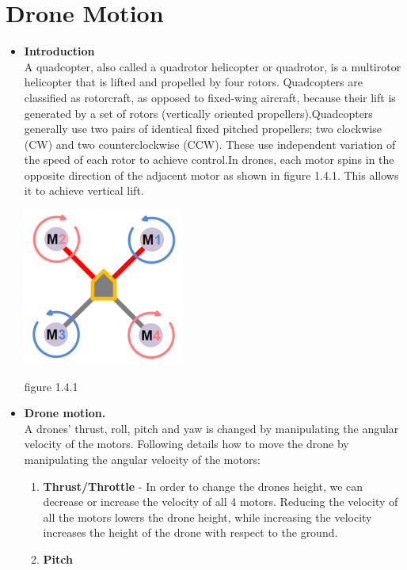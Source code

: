 \documentclass[a4paper,12pt,oneside]{book}
\begin{document}
\section{Drone Motion}
    \begin{itemize}
        \item \textbf{Introduction}\\
        A quadcopter, also called a quadrotor helicopter or quadrotor, is a multirotor helicopter that is lifted and propelled by four rotors. Quadcopters are classified as rotorcraft, as opposed to fixed-wing aircraft, because their lift is generated by a set of rotors (vertically oriented propellers).Quadcopters generally use two pairs of identical fixed pitched propellers; two clockwise (CW) and two counterclockwise (CCW). These use independent variation of the speed of each rotor to achieve control.In drones, each motor spins in the opposite direction of the adjacent motor as shown in figure 1.4.1. This allows it to achieve vertical lift.
        \begin{center}
         \includegraphics{quad_rotor.png}
        \end{center}
       \begin{center}
           figure 1.4.1
       \end{center}
        \item \textbf{Drone motion.}\\
        A drones’ thrust, roll, pitch and yaw is changed by manipulating the angular velocity of the motors. Following details how to move the drone by manipulating the angular velocity of the motors:
        \begin{enumerate}[I]
            \item \textbf{Thrust/Throttle}
             - In order to change the drones height, we can decrease or increase the velocity of all 4 motors. Reducing the velocity of all the motors lowers the drone height, while increasing the velocity increases the height of the drone with respect to the ground.
            \item\textbf{ Pitch}

\end{enumerate}
\end{itemize}
\end{document}
